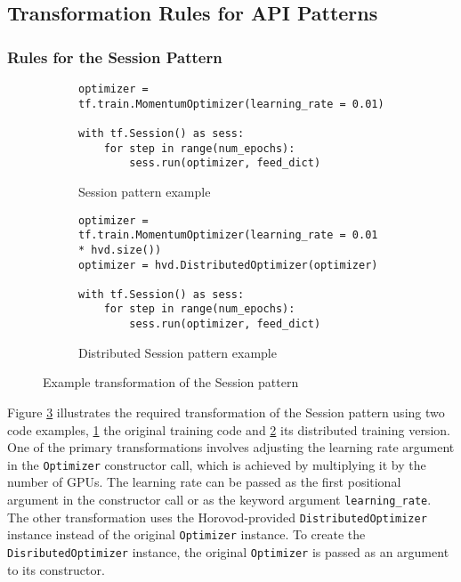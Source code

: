 \subsection{Transformation Rules for API Patterns}


\subsubsection{Rules for the Session Pattern}

\begin{figure}[ht!]\centering
  \begin{subfigure}[t]{0.9\textwidth}
    \begin{lstlisting}[style=mpython]
optimizer = tf.train.MomentumOptimizer(learning_rate = 0.01)

with tf.Session() as sess:
    for step in range(num_epochs): 
        sess.run(optimizer, feed_dict)\end{lstlisting}
    \caption{Session pattern example}
    \label{fig:trans:sessiontrans:a}
  \end{subfigure}
  \hspace{5mm}
  \begin{subfigure}[t]{0.9\textwidth}
    \begin{lstlisting}[style=mpython]
optimizer = tf.train.MomentumOptimizer(learning_rate = 0.01 * hvd.size())
optimizer = hvd.DistributedOptimizer(optimizer)

with tf.Session() as sess:
    for step in range(num_epochs): 
        sess.run(optimizer, feed_dict)\end{lstlisting}
    \caption{Distributed Session pattern example}
    \label{fig:trans:sessiontrans:b}
  \end{subfigure}
  \caption{Example transformation of the Session pattern}
  \label{fig:trans:sessiontrans}
\end{figure}

\noindent
Figure \ref{fig:trans:sessiontrans} illustrates the required transformation of
the Session pattern using two code examples, \ref{fig:trans:sessiontrans:a} the
original training code and \ref{fig:trans:sessiontrans:b} its distributed
training version.
One of the primary transformations involves adjusting the learning rate
argument in the {\tt Optimizer} constructor call, which is achieved by
multiplying it by the number of GPUs.
The learning rate can be passed as the first positional argument in the
constructor call or as the keyword argument {\tt learning\_rate}.
The other transformation uses the Horovod-provided {\tt DistributedOptimizer}
instance instead of the original {\tt Optimizer} instance. 
To create the {\tt DisributedOptimizer} instance, the original {\tt Optimizer}
is passed as an argument to its constructor.

